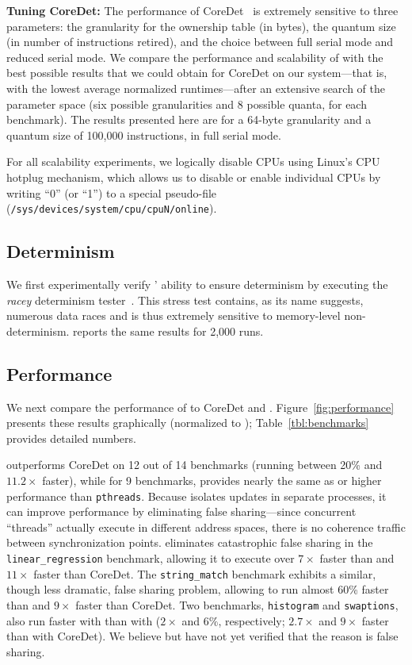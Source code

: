 \textbf{Tuning CoreDet: } 
The performance of CoreDet~\cite{Bergan:2010:CCR:1736020.1736029} is
extremely sensitive to three parameters: the granularity for the
ownership table (in bytes), the quantum size (in number of
instructions retired), and the choice between full serial mode and
reduced serial mode. We compare the performance and scalability
of \dthreads{} with the best possible results that we could obtain for
CoreDet on our system---that is, with the lowest average normalized
runtimes---after an extensive search of the parameter space (six
possible granularities and 8 possible quanta, for each benchmark). The
results presented here are for a 64-byte granularity and a quantum
size of 100,000 instructions, in full serial mode.
 
For all scalability experiments, we logically disable CPUs using
Linux's CPU hotplug mechanism, which allows us to disable or enable
individual CPUs by writing ``0'' (or ``1'') to a special pseudo-file
(\texttt{/sys/devices/system/cpu/cpuN/online}).

\subsection{Determinism}

We first experimentally verify \dthreads{}' ability to ensure
determinism by executing the \emph{racey} determinism
tester~\cite{1508256}. This stress test contains, as its name
suggests, numerous data races and is thus extremely sensitive to
memory-level non-determinism. \dthreads{} reports the same results for
2,000 runs.

\subsection{Performance}
\label{sec:performance}

We next compare the performance of \dthreads{} to CoreDet
and \pthreads{}. Figure~\ref{fig:performance} presents these results
graphically (normalized to \pthreads{}); Table~\ref{tbl:benchmarks}
provides detailed numbers.

\dthreads{} outperforms CoreDet on 12 out
of 14 benchmarks (running between 20\% and $11.2\times$ faster), while
for 9 benchmarks, \dthreads{} provides nearly the same as or higher
performance than \texttt{pthreads}. Because \dthreads{} isolates
updates in separate processes, it can improve performance by
eliminating false sharing---since concurrent ``threads'' actually
execute in different address spaces, there is no coherence traffic
between synchronization points. \dthreads{} eliminates catastrophic
false sharing in the \texttt{linear\_regression} benchmark, allowing
it to execute over $7\times$ faster than \pthreads{} and $11\times$
faster than CoreDet. The \texttt{string\_match} benchmark exhibits a
similar, though less dramatic, false sharing problem,
allowing \dthreads{} to run almost 60\% faster than \pthreads{} and
$9\times$ faster than CoreDet. Two benchmarks, \texttt{histogram}
and \texttt{swaptions}, also run faster with \dthreads{} than
with \pthreads{} ($2\times$ and $6\%$, respectively; $2.7\times$ and
$9\times$ faster than with CoreDet). We believe but have not yet
verified that the reason is false sharing.

